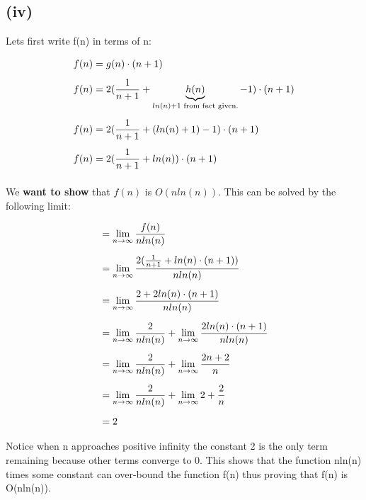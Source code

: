 \subsection*{(iv)}

Lets first write f(n) in terms of n:

\begin{align*}
   f(n) & = g(n) \cdot (n+1)\\[5pt]
   f(n) & = 2({1 \over n+1} + \underbrace{h(n)}_{ln(n)+ 1 \text{ from fact given.}} - 1) \cdot (n+1)\\[5pt]
   f(n) & = 2({1 \over n+1} + (ln(n)+1) - 1) \cdot (n+1)\\[5pt]
   f(n) & = 2({1 \over n+1} + ln(n)) \cdot (n+1)\\[5pt]
\end{align*}

We \textbf{want to show} that $f(n)$ is $O(nln(n))$. This can be solved by the following limit:

\begin{align*}
    & = \lim_{n\to\infty} {f(n) \over nln(n)}\\[5pt]
    & = \lim_{n\to\infty} {2 ({1 \over n+1} + ln(n) \cdot (n+1))   \over nln(n)}\\[5pt]
    & = \lim_{n\to\infty} { 2 + 2ln(n) \cdot (n+1)
                        \over 
                        nln(n)}\\[5pt]
    & = \lim_{n\to\infty} { 2 
                        \over 
                        nln(n)} +
        \lim_{n\to\infty} {2ln(n) \cdot (n+1)
                        \over 
                        nln(n)}\\[5pt]
    & = \lim_{n\to\infty} { 2 
                        \over 
                        nln(n)} +
        \lim_{n\to\infty} {2n + 2
                        \over 
                        n}\\[5pt]
    & = \lim_{n\to\infty} { 2 
                        \over 
                        nln(n)} +
        \lim_{n\to\infty} 2 + { 2
                        \over 
                        n}\\[5pt]
    & = 2
\end{align*}

Notice when n approaches positive infinity the constant 2 is the only term remaining because other terms converge to 0. This shows that the function nln(n) times some constant can over-bound the function f(n) thus proving that f(n) is O(nln(n)).